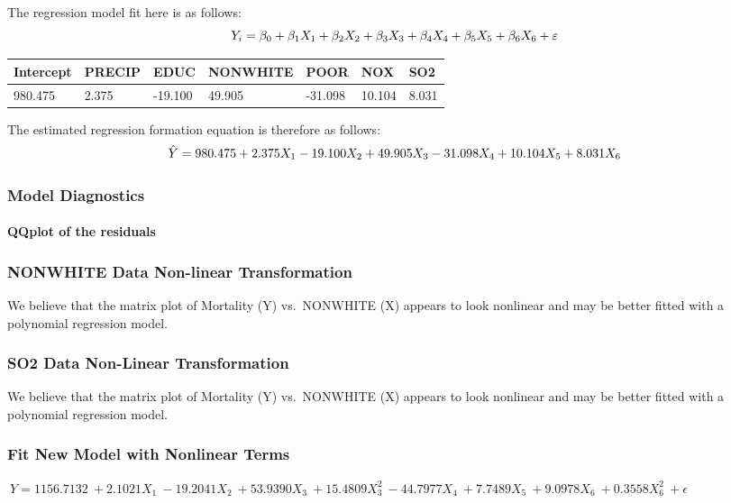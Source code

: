 \documentclass[]{article}
\let\oldparagraph\paragraph
\renewcommand{\paragraph}[1]{\oldparagraph{#1}\mbox{}}
\begin{document}
The regression model fit here is as follows:
\[\LARGE Y_i=\beta_0+\beta_1X_1+\beta_2X_2+\beta_3X_3+\beta_4X_4+\beta_5X_5+\beta_6X_6+\varepsilon\]

\begin{longtable}[]{@{}lllllll@{}}
\toprule
Intercept & PRECIP & EDUC & NONWHITE & POOR & NOX & SO2\tabularnewline
\midrule
\endhead
980.475 & 2.375 & -19.100 & 49.905 & -31.098 & 10.104 &
8.031\tabularnewline
\bottomrule
\end{longtable}

The estimated regression formation equation is therefore as follows:
\[\large \hat{Y} = 980.475+2.375X_1-19.100X_2+49.905X_3-31.098X_4+10.104X_5+8.031X_6\]

\subsubsection{\texorpdfstring{\textbf{Model
Diagnostics}}{Model Diagnostics}}\label{model-diagnostics}

\paragraph{QQplot of the residuals}\label{qqplot-of-the-residuals}

\subsubsection{NONWHITE Data Non-linear
Transformation}\label{nonwhite-data-non-linear-transformation}

We believe that the matrix plot of Mortality (Y) vs.~NONWHITE (X)
appears to look nonlinear and may be better fitted with a polynomial
regression model.

\subsubsection{SO2 Data Non-Linear
Transformation}\label{so2-data-non-linear-transformation}

We believe that the matrix plot of Mortality (Y) vs.~NONWHITE (X)
appears to look nonlinear and may be better fitted with a polynomial
regression model.

\subsubsection{Fit New Model with Nonlinear
Terms}\label{fit-new-model-with-nonlinear-terms}

\(\ Y = 1156.7132 \ + 2.1021X_1 \ -19.2041X_2 \ + 53.9390X_3 \ + 15.4809X_3^2 \ -44.7977X_4 \ + 7.7489X_5 \ + 9.0978X_6 \ + 0.3558X_6^2 \ + \epsilon\)
\end{document}
